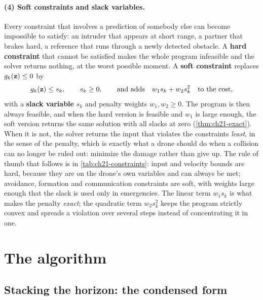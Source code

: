 \paragraph{(4) Soft constraints and slack variables.}
Every constraint that involves a prediction of somebody else can become
impossible to satisfy: an intruder that appears at short range, a partner that
brakes hard, a reference that runs through a newly detected obstacle. A
\textbf{hard constraint} that cannot be satisfied
makes the whole program infeasible and the solver returns nothing, at the worst
possible moment. A \textbf{soft constraint} replaces
$g_k(\mathbf{z})\le0$ by
\begin{equation}
g_k(\mathbf{z})\le s_k,\qquad s_k\ge0,\qquad
\text{and adds}\quad w_1 s_k+w_2 s_k^2\quad\text{to the cost},
\label{eq:ch21-slack}
\end{equation}
with a \textbf{slack variable} $s_k$ and penalty
weights $w_1,w_2\ge0$. The program is then always feasible, and when the hard
version is feasible and $w_1$ is large enough, the soft version returns the
same solution with all slacks at zero (\cref{thm:ch21-exact}). When it is
not, the solver returns the input that violates the constraints \emph{least},
in the sense of the penalty, which is exactly what a drone should do when a
collision can no longer be ruled out: minimize the damage rather than give up.
The rule of thumb that follows is in \cref{tab:ch21-constraints}: input and
velocity bounds are hard, because they are on the drone's own variables and can
always be met; avoidance, formation and communication constraints are soft,
with weights large enough that the slack is used only in emergencies. The
linear term $w_1s_k$ is what makes the penalty \emph{exact}; the quadratic
term $w_2s_k^2$ keeps the program strictly convex and spreads a violation
over several steps instead of concentrating it in one.

\section{The algorithm}
\label{sec:ch21-algorithm}

\subsection{Stacking the horizon: the condensed form}
\label{sec:ch21-condensed}

